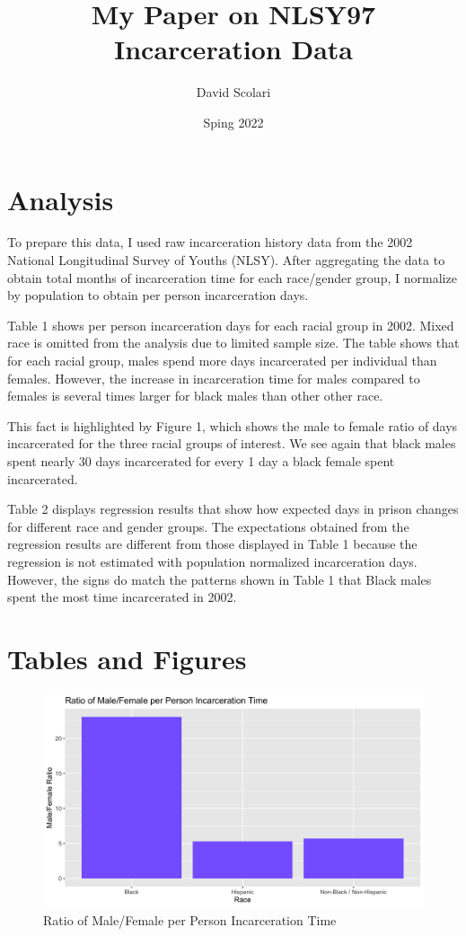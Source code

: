 \documentclass{article}
\author{David Scolari}
\title{My Paper on NLSY97 Incarceration Data}
\date{Sping 2022}
\begin{document}
\maketitle

\section{Analysis}


To prepare this data, I used raw incarceration history data from the 2002 National Longitudinal Survey of Youths (NLSY). After aggregating the data to obtain total months of incarceration time for each race/gender group, I normalize by population to obtain per person incarceration days. 

Table 1 shows per person incarceration days for each racial group in 2002. Mixed race is omitted from the analysis due to limited sample size. The table shows that for each racial group, males spend more days incarcerated per individual than females. However, the increase in incarceration time for males compared to females is several times larger for black males than other other race.

This fact is highlighted by Figure 1, which shows the male to female ratio of days incarcerated for the three racial groups of interest. We see again that black males spent nearly 30 days incarcerated for every 1 day a black female spent incarcerated. 

Table 2 displays regression results that show how expected days in prison changes for different race and gender groups. The expectations obtained from the regression results are different from those displayed in Table 1 because the regression is not estimated with population normalized  incarceration days. However, the signs do match the patterns shown in Table 1 that Black males spent the most time incarcerated in 2002. 

\section{Tables and Figures}



\begin{figure}[H]
    \begin{center}
        \includegraphics[width=.85\textwidth]{../figures/inc_bar.png}
    \end{center}
    \caption{Ratio of Male/Female per Person Incarceration Time}
    \label{fig:graph}
\end{figure}




\end{document}
